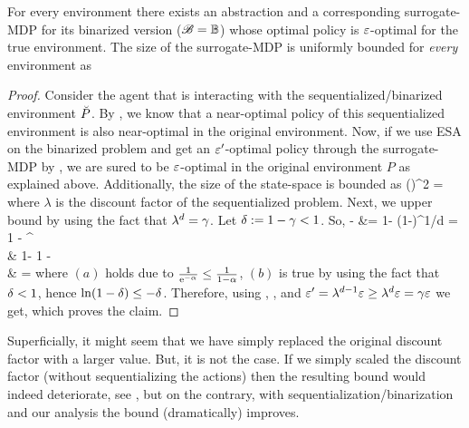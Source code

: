 \documentclass{article} %
\let\thmOrg\theorem
\let\endthmOrg\endtheorem
\renewenvironment{theorem}{\begin{tcolorbox}\thmOrg}{\endthmOrg\end{tcolorbox}}
\begin{document}
\begin{theorem}[Binary ESA] \label{thm:bin-esa}
For every environment there exists an abstraction and a corresponding surrogate-MDP for its binarized version ($\mathscr{B} = \mathbb{B}$) whose optimal policy is $\varepsilon$-optimal for the true environment. The size of the surrogate-MDP is uniformly bounded for \emph{every} environment as
\beqn
\abs{\S} \leq {}
\eeqn
\end{theorem}
\begin{proof}
Consider the agent that is interacting with the sequentialized/binarized environment $\breve{P}$. By , we know that a near-optimal policy of this sequentialized environment is also near-optimal in the original environment. Now, if we use ESA on the binarized problem and get an $\varepsilon'$-optimal policy through the surrogate-MDP by , we are sured to be $\varepsilon$-optimal in the original environment $P$ as explained above. Additionally, the size of the state-space is bounded as
\beq\label{eq:bound}
\abs{\S}  \left(\right)^2 = 
\eeq
where $\lambda$ is the discount factor of the sequentialized problem.
Next, we upper bound  by using the fact that $\lambda^d = \gamma$. Let $\delta := 1 - \gamma < 1$. So,
 - \lambda
&= 1- (1-\del)^{1/d} = 1 - \e^{}\\
& 1- 
 1 -  \\
&\overset{}{=}  = 
\numberthis \label{eq:bound2}
\eqan
where $(a)$ holds due to $\frac{1}{{\rm e}^{-\alpha}} \leq \frac{1}{1-\alpha}$, $(b)$ is true by using the fact that $\delta < 1$, hence $\ln(1-\delta) \leq - \delta$.
Therefore, using , , and $\varepsilon' = \lambda^{d-1}\varepsilon \geq \lambda^d \varepsilon = \gamma \varepsilon$
we get,
\beq
\abs{\S} \leq {} \leq  {}
\eeq
which proves the claim.
\end{proof}

Superficially, it might seem that we have simply replaced the original discount factor with a larger value. But, it is not the case. If we simply scaled the discount factor (without sequentializing the actions) then the resulting bound would indeed deteriorate, see , but on the contrary, with sequentialization/binarization and our analysis the bound (dramatically) improves.
\end{document}
